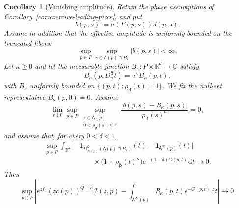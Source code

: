 \documentclass[11pt]{amsart}
\numberwithin{equation}{section}
\newtheorem{corollary}[theorem]{Corollary}
\theoremstyle{definition}
\theoremstyle{remark}
\newcommand{\R}{\mathbb{R}}
\newcommand{\C}{\mathbb{C}}
\newcommand{\ind}{\mathbf{1}}
\newcommand{\dd}{\,\mathrm{d}}
\newcommand{\eps}{\varepsilon}
\newcommand{\cI}{\mathcal{I}}
\newcommand{\Afib}{\mathsf{A}}
\begin{document}
\begin{corollary}[Vanishing amplitude]\label{cor:vanishing-amplitude}
Retain the phase assumptions of
Corollary~\ref{cor:coercive-leading-piece}, and put
\[
 b(p,s):=a(F(p,s))J(p,s).
\]
Assume in addition that the effective amplitude is uniformly bounded on
the truncated fibers:
\begin{equation}\label{eq:vanishing-amplitude-bounded}
 \sup_{p\in P}\sup_{s\in\Afib(p)\cap B_\eps}|b(p,s)|<\infty.
\end{equation}
Let $\kappa\ge0$ and let the measurable function
$B_\kappa:P\times\R^d\to\C$ satisfy
\begin{equation}\label{eq:B-kappa-hom}
  B_\kappa(p,D_u^{\bm\beta}t)=u^\kappa B_\kappa(p,t),
\end{equation}
with $B_\kappa$ uniformly bounded on
$\{(p,t):\rho_{\bm\beta}(t)=1\}$.  We fix the null-set representative
$B_\kappa(p,0)=0$.  Assume
\begin{equation}\label{eq:B-kappa-remainder}
 \lim_{r\downarrow0}\sup_{p\in P}
 \sup_{\substack{s\in\Afib(p)\\0<\rho_{\bm\beta}(s)\le r}}
 \frac{|b(p,s)-B_\kappa(p,s)|}
      {\rho_{\bm\beta}(s)^\kappa}=0,
\end{equation}
and assume that, for every $0<\delta<1$,
\begin{equation}\label{eq:weighted-cell-limit-kappa}
\begin{split}
 \sup_{p\in P}\int_{\R^d}
 \Big|&\ind_{D_{zc(p)}^{\bm\beta}(\Afib(p)\cap B_\eps)}(t)
      -\ind_{\Afib^\infty(p)}(t)\Big|\\
 &\hspace{2em}\times
 \bigl(1+\rho_{\bm\beta}(t)^\kappa\bigr)
 e^{-(1-\delta)G(p,t)}\dd t\longrightarrow0.
\end{split}
\end{equation}
Then
\begin{equation}\label{eq:vanishing-amplitude-result}
 \sup_{p\in P}\left|
 e^{zf_0}(zc(p))^{Q+\kappa}\cI(z,p)
 -\int_{\Afib^\infty(p)}B_\kappa(p,t)e^{-G(p,t)}\dd t
 \right|\longrightarrow0.
\end{equation}
\end{corollary}
\end{document}
